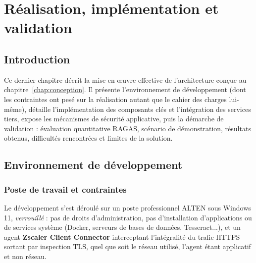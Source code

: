 \chapter{Réalisation, implémentation et validation}
\label{chap:realisation}

\section{Introduction}

Ce dernier chapitre décrit la mise en œuvre effective de l'architecture conçue au
chapitre~\ref{chap:conception}. Il présente l'environnement de développement (dont les
contraintes ont pesé sur la réalisation autant que le cahier des charges lui-même),
détaille l'implémentation des composants clés et l'intégration des services tiers, expose
les mécanismes de sécurité applicative, puis la démarche de validation : évaluation
quantitative RAGAS, scénario de démonstration, résultats obtenus, difficultés rencontrées
et limites de la solution.

\section{Environnement de développement}
\label{sec:env-dev}

\subsection{Poste de travail et contraintes}

Le développement s'est déroulé sur un poste professionnel ALTEN sous Windows 11,
\emph{verrouillé} : pas de droits d'administration, pas d'installation d'applications ou
de services système (Docker, serveurs de bases de données, Tesseract...), et un agent
\textbf{Zscaler Client Connector} interceptant l'intégralité du trafic HTTPS sortant par
inspection TLS, quel que soit le réseau utilisé, l'agent étant applicatif et non
réseau.

